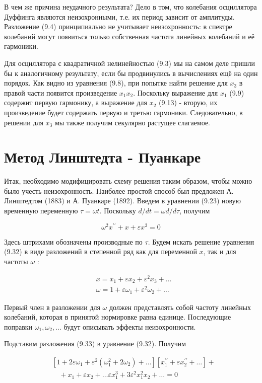 \documentclass[10pt]{article}
\begin{document}
В чем же причина неудачного результата? Дело в том, что колебания осциллятора Дуффинга являются неизохронными, т.е. их период зависит от амплитуды. Разложение (9.4) принципиально не учитывает неизохронность: в спектре колебаний могут появиться только собственная частота линейных колебаний и её гармоники.

Для осциллятора с квадратичной нелинейностью (9.3) мы на самом деле пришли бы к аналогичному результату, если бы продвинулись в вычислениях ещё на один порядок. Как видно из уравнения (9.8), при попытке найти решение для $x_{3}$ в правой части появится произведение $x_{1} x_{2}$. Поскольку выражение для $x_{1}$ (9.9) содержит первую гармонику, а выражение для $x_{2}$ (9.13) - вторую, их произведение будет содержать первую и третью гармоники. Следовательно, в решении для $x_{3}$ мы также получим секулярно растущее слагаемое.

\section*{Метод Линштедта - Пуанкаре}
Итак, необходимо модифицировать схему решения таким образом, чтобы можно было учесть неизохронность. Наиболее простой способ был предложен А. Линштедтом (1883) и А. Пуанкаре (1892). Введем в уравнении (9.23) новую временную переменную $\tau=\omega t$. Поскольку $d / d t=\omega d / d \tau$, получим


\begin{equation*}
\omega^{2} x^{\prime \prime}+x+\varepsilon x^{3}=0 \tag{9.32}
\end{equation*}


Здесь штрихами обозначены производные по $\tau$. Будем искать решение уравнения (9.32) в виде разложений в степенной ряд как для переменной $x$, так и для частоты $\omega$ :


\begin{align*}
& x=x_{1}+\varepsilon x_{2}+\varepsilon^{2} x_{3}+\ldots  \tag{9.33}\\
& \omega=1+\varepsilon \omega_{1}+\varepsilon^{2} \omega_{2}+\ldots
\end{align*}


Первый член в разложении для $\omega$ должен представлять собой частоту линейных колебаний, которая в принятой нормировке равна единице. Последующие поправки $\omega_{1}, \omega_{2}, \ldots$ будут описывать эффекты неизохронности.

Подставим разложения (9.33) в уравнение (9.32). Получим


\begin{align*}
& {\left[1+2 \varepsilon \omega_{1}+\varepsilon^{2}\left(\omega_{1}^{2}+2 \omega_{2}\right)+\ldots\right]\left[x_{1}^{\prime \prime}+\varepsilon x_{2}^{\prime \prime}+\ldots\right]+}  \tag{9.34}\\
& \quad+x_{1}+\varepsilon x_{2}+\ldots \varepsilon x_{1}^{3}+3 \varepsilon^{2} x_{1}^{2} x_{2}+\ldots=0
\end{align*}
\end{document}
